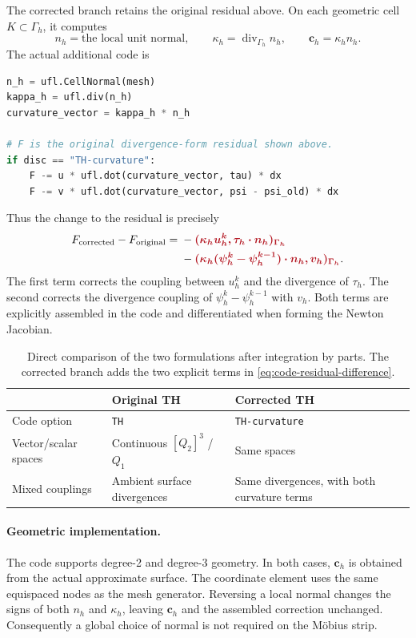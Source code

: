 \documentclass[11pt,a4paper]{article}
\newcommand{\curv}[1]{{\color{curvred}\bm{#1}}}
\newcommand{\G}{\Gamma}
\newcommand{\cv}{\mathbf c}
\newcommand{\code}[1]{\texttt{#1}}
\begin{document}
The corrected branch retains the original residual above. On each
geometric cell $K\subset\G_h$, it computes
\begin{equation}
 n_h=\text{the local unit normal},\qquad
 \kappa_h=\operatorname{div}_{\G_h}n_h,\qquad
 \cv_h=\kappa_h n_h.
 \label{eq:code-curvature}
\end{equation}
The actual additional code is
\begin{lstlisting}[language=Python]
n_h = ufl.CellNormal(mesh)
kappa_h = ufl.div(n_h)
curvature_vector = kappa_h * n_h

# F is the original divergence-form residual shown above.
if disc == "TH-curvature":
    F -= u * ufl.dot(curvature_vector, tau) * dx
    F -= v * ufl.dot(curvature_vector, psi - psi_old) * dx
\end{lstlisting}
Thus the change to the residual is precisely
\begin{equation}
\begin{aligned}
 F_{\mathrm{corrected}}-F_{\mathrm{original}}
 ={}&-\curv{(\kappa_h u_h^k,\tau_h\cdot n_h)_{\G_h}}\\
    &-\curv{(\kappa_h(\psi_h^k-\psi_h^{k-1})\cdot n_h,v_h)_{\G_h}}.
\end{aligned}
\label{eq:code-residual-difference}
\end{equation}
The first term corrects the coupling between $u_h^k$ and the divergence
of $\tau_h$. The second corrects the divergence coupling of
$\psi_h^k-\psi_h^{k-1}$ with $v_h$. Both terms are explicitly assembled
in the code and differentiated when forming the Newton Jacobian.

\begin{table}[ht]
\centering\small
\begin{tabularx}{\linewidth}{@{}lYY@{}}
\toprule
 & Original TH & Corrected TH\\
\midrule
Code option & \code{TH} & \code{TH-curvature}\\
Vector/scalar spaces & Continuous $[Q_2]^3$ / $Q_1$ & Same spaces\\
Mixed couplings & Ambient surface divergences & Same divergences, with both curvature terms\\
\bottomrule
\end{tabularx}
\caption{Direct comparison of the two formulations after integration by
parts. The corrected branch adds the two explicit terms in
\eqref{eq:code-residual-difference}.}
\label{tab:spaces}
\end{table}

\paragraph{Geometric implementation.}
The code supports degree-2 and degree-3 geometry. In both cases,
$\cv_h$ is obtained from the actual approximate surface. The coordinate element
uses the same equispaced nodes as the mesh generator. Reversing a local
normal changes the signs of both $n_h$ and $\kappa_h$, leaving $\cv_h$
and the assembled correction unchanged. Consequently a global choice
of normal is not required on the M\"obius strip.
\end{document}
